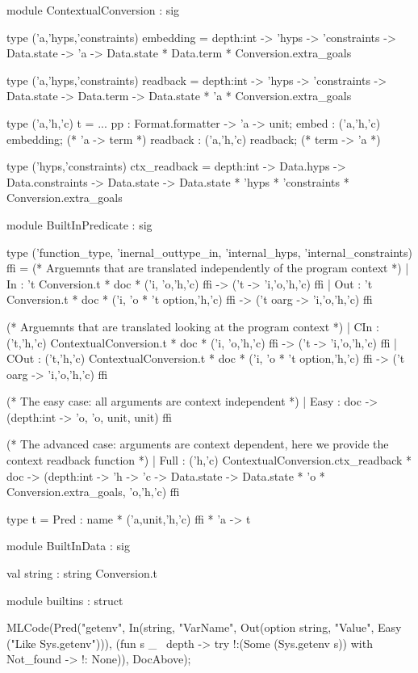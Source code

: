 \documentclass[a4paper, 11pt]{book}
\begin{document}
\begin{ocamlcode}
module ContextualConversion : sig

type ('a,'hyps,'constraints) embedding =
  depth:int -> 'hyps -> 'constraints ->
  Data.state -> 'a -> Data.state * Data.term * Conversion.extra_goals

type ('a,'hyps,'constraints) readback =
  depth:int -> 'hyps -> 'constraints ->
  Data.state -> Data.term -> Data.state * 'a * Conversion.extra_goals

type ('a,'h,'c) t = {
  ...
  pp : Format.formatter -> 'a -> unit;
  embed : ('a,'h,'c) embedding;   (* 'a -> term *)
  readback : ('a,'h,'c) readback; (* term -> 'a *)
}

type ('hyps,'constraints) ctx_readback =
  depth:int -> Data.hyps -> Data.constraints ->
  Data.state -> Data.state * 'hyps * 'constraints * Conversion.extra_goals
\end{ocamlcode}


\begin{ocamlcode}
module BuiltInPredicate : sig

type ('function_type, 'inernal_outtype_in, 'internal_hyps, 'internal_constraints) ffi =
  (* Arguemnts that are translated independently of the program context *)
  | In    : 't Conversion.t * doc * ('i, 'o,'h,'c) ffi -> ('t -> 'i,'o,'h,'c) ffi
  | Out   : 't Conversion.t * doc * ('i, 'o * 't option,'h,'c) ffi -> ('t oarg -> 'i,'o,'h,'c) ffi

  (* Arguemnts that are translated looking at the program context *)
  | CIn    : ('t,'h,'c) ContextualConversion.t * doc * ('i, 'o,'h,'c) ffi -> ('t -> 'i,'o,'h,'c) ffi
  | COut   : ('t,'h,'c) ContextualConversion.t * doc * ('i, 'o * 't option,'h,'c) ffi -> ('t oarg -> 'i,'o,'h,'c) ffi

  (* The easy case: all arguments are context independent *)
  | Easy : doc -> (depth:int -> 'o, 'o, unit, unit) ffi

  (* The advanced case: arguments are context dependent, here we provide the
    context readback function *)
  | Full : ('h,'c) ContextualConversion.ctx_readback * doc -> (depth:int -> 'h -> 'c -> Data.state -> Data.state * 'o * Conversion.extra_goals, 'o,'h,'c) ffi

type t = Pred : name * ('a,unit,'h,'c) ffi * 'a -> t
\end{ocamlcode}

  
\begin{ocamlcode}
  module BuiltInData : sig

  val string : string Conversion.t

  module builtins : struct

  MLCode(Pred("getenv",
  In(string,  "VarName",
  Out(option string, "Value",
  Easy      ("Like Sys.getenv"))),
(fun s _ ~depth ->
   try !:(Some (Sys.getenv s))
   with Not_found -> !: None)),
DocAbove);

\end{ocamlcode}
\end{document}
